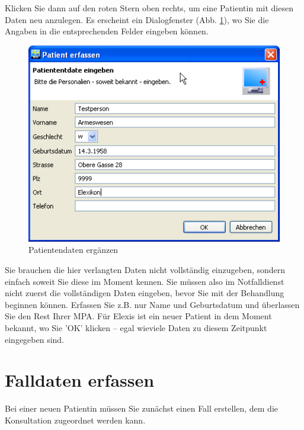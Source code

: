 Klicken Sie dann auf den roten Stern oben rechts, um eine Patientin mit diesen
Daten neu anzulegen. Es erscheint ein Dialogfenster (Abb. \ref{fig:patdata}), wo
Sie die Angaben in die entsprechenden Felder eingeben können.\\
\bigskip

\begin{figure}[ht]
	\includegraphics{images/einf2}
	\caption{Patientendaten ergänzen}
	\label{fig:patdata}
\end{figure}
Sie brauchen die hier verlangten Daten nicht vollständig einzugeben, sondern einfach soweit Sie diese im Moment kennen.
Sie müssen also im Notfalldienst nicht zuerst die vollständigen Daten eingeben, bevor Sie mit der Behandlung beginnen können.
Erfassen Sie z.B. nur Name und Geburtsdatum und überlassen Sie den Rest Ihrer MPA. Für Elexis ist ein neuer Patient in dem Moment bekannt,
wo Sie 'OK' klicken -- egal wieviele Daten zu diesem Zeitpunkt eingegeben sind.

\section{Falldaten erfassen}
Bei einer neuen Patientin müssen Sie zunächst einen \glqq Fall\grqq{} erstellen, dem
die Konsultation zugeordnet werden kann.


